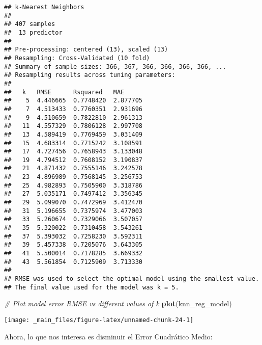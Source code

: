 \documentclass[]{book}
\newenvironment{Shaded}{\begin{snugshade}}{\end{snugshade}}
\newcommand{\CommentTok}[1]{\textcolor[rgb]{0.56,0.35,0.01}{\textit{#1}}}
\newcommand{\KeywordTok}[1]{\textcolor[rgb]{0.13,0.29,0.53}{\textbf{#1}}}
\newcommand{\NormalTok}[1]{#1}
\newcommand{\OperatorTok}[1]{\textcolor[rgb]{0.81,0.36,0.00}{\textbf{#1}}}
\newcommand{\StringTok}[1]{\textcolor[rgb]{0.31,0.60,0.02}{#1}}
\begin{document}
\begin{verbatim}
## k-Nearest Neighbors 
## 
## 407 samples
##  13 predictor
## 
## Pre-processing: centered (13), scaled (13) 
## Resampling: Cross-Validated (10 fold) 
## Summary of sample sizes: 366, 367, 366, 366, 366, 366, ... 
## Resampling results across tuning parameters:
## 
##   k   RMSE      Rsquared   MAE     
##    5  4.446665  0.7748420  2.877705
##    7  4.513433  0.7760351  2.931696
##    9  4.510659  0.7822810  2.961313
##   11  4.557329  0.7806128  2.997708
##   13  4.589419  0.7769459  3.031409
##   15  4.683314  0.7715242  3.108591
##   17  4.727456  0.7658943  3.133048
##   19  4.794512  0.7608152  3.190837
##   21  4.871432  0.7555146  3.242578
##   23  4.896989  0.7568145  3.256753
##   25  4.982893  0.7505900  3.318786
##   27  5.035171  0.7497412  3.356345
##   29  5.099070  0.7472969  3.412470
##   31  5.196655  0.7375974  3.477003
##   33  5.260674  0.7329066  3.507057
##   35  5.320022  0.7310458  3.543261
##   37  5.393032  0.7258230  3.592311
##   39  5.457338  0.7205076  3.643305
##   41  5.500014  0.7178285  3.669332
##   43  5.561854  0.7125909  3.713330
## 
## RMSE was used to select the optimal model using the smallest value.
## The final value used for the model was k = 5.
\end{verbatim}

\begin{Shaded}
\begin{Highlighting}[]
\CommentTok{# Plot model error RMSE vs different values of k}
\KeywordTok{plot}\NormalTok{(knn_reg_model)}
\end{Highlighting}
\end{Shaded}

\begin{center}\texttt{[image: \_main\_files/figure-latex/unnamed-chunk-24-1]} \end{center}

Ahora, lo que nos interesa es disminuir el Error Cuadrático Medio:

\begin{Shaded}
\end{Shaded}
\end{document}
